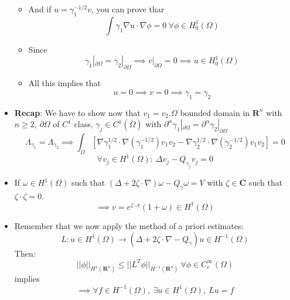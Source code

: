 \documentclass{article}
\begin{document}
\begin{itemize}
\begin{itemize}
        \item And if $u = \gamma^{-1/2}_1 v$, you can prove thar
        \begin{equation}
            \int \gamma_1  \nabla u \cdot \nabla \phi = 0  \ \forall \phi \in H_0^1(\Omega)
        \end{equation}
    
        \item Since
        \begin{equation}
            \gamma_1|_{\partial \Omega} = \gamma_2|_{\partial \Omega} \implies v|_{\partial \Omega} = 0 \implies u \in H^1_0(\Omega)
        \end{equation}
    
        \item All this implies that
        \begin{equation}
            u = 0 \implies v= 0 \implies \gamma_1 = \gamma_2
        \end{equation}
    \end{itemize}

    \item \textbf{Recap}: We have to show now that $v_1 = v_2$.$\Omega$ bounded domain in $\mathbf{R}^n$ with $n\geq 2$, $\partial \Omega$ of $C^1$ class, $\gamma_j \in C^1(\overline{\Omega})$ with $\partial^\alpha \gamma_1|_{\partial \Omega} = \partial^\alpha \gamma_2|_{\partial \Omega}$
    \begin{equation}\label{orthogonality-relation}
        \Lambda_{\gamma_1} = \Lambda_{\gamma_2} \implies \int_\Omega [\nabla \gamma^{1/2}_1 \cdot \nabla (\gamma^{-1/2}_1) v_1v_2 - \nabla \gamma^{1/2}_2 \cdot \nabla (\gamma^{-1/2}_2) v_1v_2] = 0
    \end{equation}
    \begin{equation}
        \forall v_j \in H^1(\Omega): \ \Delta v_j - Q_{\gamma_j} v_j = 0
    \end{equation}
    
    \item If $\omega \in H^1(\Omega)$ such that $(\Delta + 2\zeta \cdot \nabla ) \omega - Q_\gamma \omega = V$ with $\zeta \in \mathbf{C}$ such that $\zeta \cdot \zeta = 0$.
    \begin{equation}
        \implies v = e^{\zeta \cdot x} (1 + \omega) \in H^1(\Omega)
    \end{equation}

    \item Remember that we now apply the method of a priori estimates:
    \begin{equation}
        L: u \in H^1(\Omega) \rightarrow (\Delta + 2\zeta \cdot \nabla - Q_\gamma ) u \in H^{-1}(\Omega)
    \end{equation}
    Then:
    \begin{equation}\label{inequality}
        ||\phi||_{H^1(\mathbf{R}^n)} \leq ||L^T \phi||_{H^{-1}(\mathbf{R}^n)} \ \forall \phi \in C^\infty_c (\Omega)
    \end{equation}
    implies
    \begin{equation}
        \implies \forall f \in H^{-1}(\Omega), \ \exists u  \in H^1(\Omega), \ Lu = f
    \end{equation}


\end{itemize}
\end{document}

